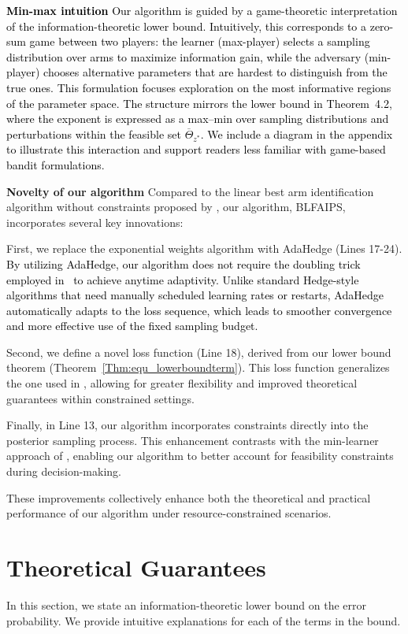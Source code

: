 \documentclass[accepted]{uai2025} %
\newcommand{\red}[1]{\textcolor{black}{#1}}
\theoremstyle{plain}
\theoremstyle{definition}
\theoremstyle{remark}
\begin{document}
\red{\textbf{Min-max intuition} Our algorithm is guided by a game-theoretic interpretation of the information-theoretic lower bound. Intuitively, this corresponds to a zero-sum game between two players: the learner (max-player) selects a sampling distribution over arms to maximize information gain, while the adversary (min-player) chooses alternative parameters that are hardest to distinguish from the true ones. This formulation focuses exploration on the most informative regions of the parameter space. The structure mirrors the lower bound in Theorem~4.2, where the exponent is expressed as a max–min over sampling distributions and perturbations within the feasible set \( \overline{\Theta}_{z^*} \). We include a diagram in the appendix to illustrate this interaction and support readers less familiar with game-based bandit formulations.
}

\textbf{Novelty of our algorithm}
Compared to the linear best arm identification algorithm without constraints proposed by \citet{li2024optimal}, our algorithm, BLFAIPS, incorporates several key innovations:

First, we replace the exponential weights algorithm with AdaHedge (Lines 17-24). 
\red{By utilizing AdaHedge, our algorithm does not require the doubling trick employed in~\citet{li2024optimal} to achieve anytime adaptivity. Unlike standard Hedge-style algorithms that need manually scheduled learning rates or restarts, AdaHedge automatically adapts to the loss sequence, which leads to smoother convergence and more effective use of the fixed sampling budget.}

Second, we define a novel loss function (Line 18), derived from our lower bound theorem (Theorem~\ref{Thm:equ_lowerboundterm}). This loss function generalizes the one used in \citet{li2024optimal}, allowing for greater flexibility and improved theoretical guarantees within constrained settings.

Finally, in Line 13, our algorithm incorporates constraints directly into the posterior sampling process. This enhancement contrasts with the min-learner approach of \citet{li2024optimal}, enabling our algorithm to better account for feasibility constraints during decision-making.

These improvements collectively enhance both the theoretical and practical performance of our algorithm under resource-constrained scenarios.

\section{Theoretical Guarantees}
\label{sec:4}
In this section, we  state an information-theoretic lower bound on the error probability.  We provide intuitive explanations for each of the terms in the bound.
\end{document}
